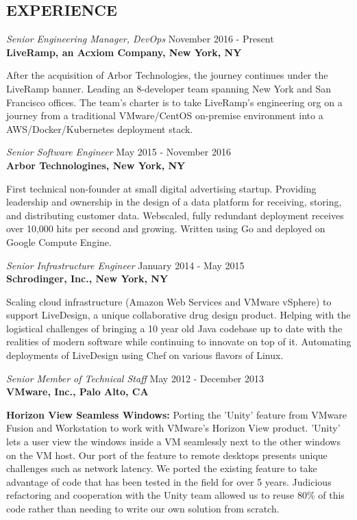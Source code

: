 \documentclass[overlapped,line,margin]{res}
\begin{document}
\begin{resume}
\section{EXPERIENCE}
{\sl Senior Engineering Manager, DevOps} \hfill November 2016 - Present \\
\textbf{LiveRamp, an Acxiom Company, New York, NY}

  After the acquisition of Arbor Technologies, the journey continues under
  the LiveRamp banner. Leading an 8-developer team spanning New York
  and San Francisco offices. The team's charter is to take LiveRamp's
  engineering org on a journey from a traditional VMware/CentOS
  on-premise environment into a AWS/Docker/Kubernetes deployment stack.

{\sl Senior Software Engineer} \hfill May 2015 - November 2016 \\
\textbf{Arbor Technologines, New York, NY}

  First technical non-founder at small digital advertising startup. Providing
  leadership and ownership in the design of a data platform for receiving,
  storing, and distributing customer data. Webscaled, fully redundant
  deployment receives over 10,000 hits per second and growing. Written using Go
  and deployed on Google Compute Engine.

{\sl Senior Infrastructure Engineer} \hfill January 2014 - May 2015 \\
\textbf{Schrodinger, Inc., New York, NY}

  Scaling cloud infrastructure (Amazon Web Services and VMware vSphere) to
  support LiveDesign, a unique collaborative drug design product. Helping with
  the logistical challenges of bringing a 10 year old Java codebase up to date
  with the realities of modern software while continuing to innovate on top of
  it. Automating deployments of LiveDesign using Chef on various flavors of
  Linux.

{\sl Senior Member of Technical Staff} \hfill May 2012 - December 2013 \\
\textbf{VMware, Inc., Palo Alto, CA}

  \textbf{Horizon View Seamless Windows:} Porting the 'Unity' feature
  from VMware Fusion and Workstation to work with VMware's Horizon View product.
  'Unity' lets a user view the windows inside a VM seamlessly next to the other
  windows on the VM host. Our port of the feature to remote desktops presents
  unique challenges such as network latency. We ported the existing feature to
  take advantage of code that has been tested in the field for over 5 years.
  Judicious refactoring and cooperation with the Unity team allowed us to reuse
  80\% of this code rather than needing to write our own solution from scratch.


\end{resume}
\end{document}
